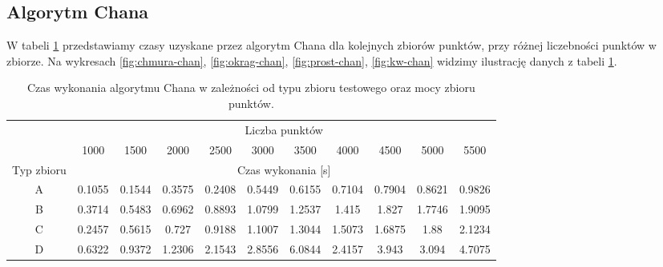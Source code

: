 \documentclass[11pt]{article}
\theoremstyle{remark} \newtheorem{definition}{def.}
\theoremstyle{definition} \newtheorem{twierdzenie}{tw.}
\begin{document}
\subsection{Algorytm Chana}

W tabeli \ref{tab:chan} przedstawiamy czasy uzyskane przez algorytm Chana dla kolejnych zbiorów punktów, przy różnej liczebności punktów w zbiorze. Na wykresach \ref{fig:chmura-chan}, 
\ref{fig:okrag-chan}, \ref{fig:prost-chan}, \ref{fig:kw-chan} widzimy ilustrację danych z tabeli \ref{tab:chan}.

\begin{table}[]
\centering
\caption{Czas wykonania algorytmu Chana w zależności od typu zbioru testowego oraz mocy zbioru punktów.}
\label{tab:chan}
\begin{tabular}{c|c|c|c|c|c|c|c|c|c|c|}
\cline{2-11}
\multicolumn{1}{l|}{} & \multicolumn{10}{c|}{Liczba punktów} \\ \cline{2-11} 
\multicolumn{1}{l|}{} & 1000 & 1500 & 2000 & 2500 & 3000 & 3500 & 4000 & 4500 & 5000 & 5500 \\ \hline
\multicolumn{1}{|c|}{Typ zbioru} & \multicolumn{10}{c|}{Czas wykonania {[}s{]}} \\ \hline
\multicolumn{1}{|c|}{A} & 0.1055 & 0.1544 & 0.3575 & 0.2408 & 0.5449 & 0.6155 & 0.7104 & 0.7904 & 0.8621 & 0.9826 \\ \hline
\multicolumn{1}{|c|}{B} & 0.3714 & 0.5483 & 0.6962 & 0.8893 & 1.0799 & 1.2537 & 1.415 & 1.827 & 1.7746 & 1.9095 \\ \hline
\multicolumn{1}{|c|}{C} & 0.2457 & 0.5615 & 0.727 & 0.9188 & 1.1007 & 1.3044 & 1.5073 & 1.6875 & 1.88 & 2.1234 \\ \hline
\multicolumn{1}{|c|}{D} & 0.6322 & 0.9372 & 1.2306 & 2.1543 & 2.8556 & 6.0844 & 2.4157 & 3.943 & 3.094 & 4.7075 \\ \hline
\end{tabular}
\end{table}
\end{document}
